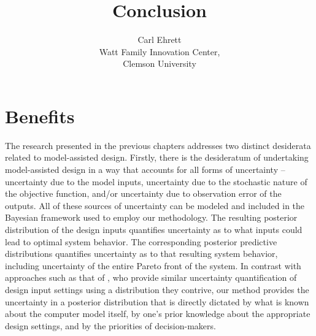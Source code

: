 \documentclass[12pt]{article}
\date{}
\begin{document}
	
\def\spacingset#1{\renewcommand{\baselinestretch}%
	{#1}\small\normalsize} \spacingset{1}


\title{\bf Conclusion}
\author{Carl Ehrett\\
	Watt Family Innovation Center, \\Clemson University}
\maketitle

\spacingset{2} 



%
%
%
%	

\section{Benefits}

The research presented in the previous chapters addresses two distinct desiderata related to model-assisted design.
Firstly, there is the desideratum of undertaking model-assisted design in a way that accounts for all forms of uncertainty -- uncertainty due to the model inputs, uncertainty due to the stochastic nature of the objective function, and/or uncertainty due to observation error of the outputs.
All of these sources of uncertainty can be modeled and included in the Bayesian framework used to employ our methodology.
The resulting posterior distribution of the design inputs quantifies uncertainty as to what inputs could lead to optimal system behavior.
The corresponding posterior predictive distributions quantifies uncertainty as to that resulting system behavior, including uncertainty of the entire Pareto front of the system.
In contrast with approaches such as that of \citet{Olalotiti-Lawal2015}, who provide similar uncertainty quantification of design input settings using a distribution they contrive, our method provides the uncertainty in a posterior distribution that is directly dictated by what is known about the computer model itself, by one's prior knowledge about the appropriate design settings, and by the priorities of decision-makers.
\end{document}
